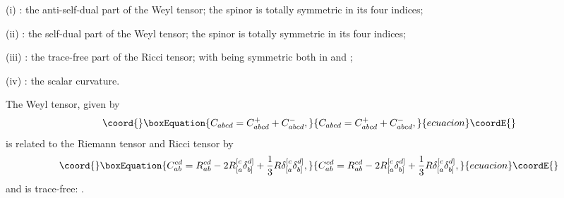 \documentclass[a4paper,12pt]{article}
\begin{document}
(i)\coordHE{} : the anti-self-dual part of the Weyl tensor; the spinor \coordHE{} is totally symmetric in its four indices;\par
(ii)\coordHE{} : the self-dual part of the Weyl tensor; the spinor \coordHE{} is totally symmetric in its four indices;\par
(iii)\coordHE{} : the trace-free part of the Ricci tensor; with \coordHE{} being symmetric both in \coordHE{} and \coordHE{};\par
(iv)\coordHE{} : the scalar curvature.\par

The Weyl tensor, given by
\begin{equation}\coord{}\boxEquation{
C_{abcd}=C^{+}_{abcd}+C^{-}_{abcd},
}{
C_{abcd}=C^{+}_{abcd}+C^{-}_{abcd},
}{ecuacion}\coordE{}\end{equation}
is related to the Riemann tensor and Ricci tensor by
\begin{equation}\coord{}\boxEquation{
C_{ab}^{cd}=R_{ab}^{cd}-2R_{[a}^{[c}\delta_{b]}^{d]}+\frac{1}{3}R\delta_{[a}^{[c}\delta_{b]}^{d]},
}{
C_{ab}^{cd}=R_{ab}^{cd}-2R_{[a}^{[c}\delta_{b]}^{d]}+\frac{1}{3}R\delta_{[a}^{[c}\delta_{b]}^{d]},
}{ecuacion}\coordE{}\end{equation}
and is trace-free: \coordHE{}.
\end{document}
